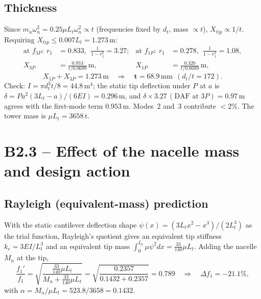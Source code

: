 \documentclass[11pt,a4paper]{article}
\begin{document}
\subsection*{Thickness}
Since $m_n\omega_n^2=0.25\mu L_t\omega_n^2\propto t$ (frequencies fixed by $d_t$, mass $\propto t$), $X_{tip}\propto1/t$. Requiring $X_{tip}\le0.007L_t=1.273\,\mathrm{m}$:
\begin{align*}
\text{at }f_{3P}:\ r_1&=0.833,\ \ \frac{1}{1-r_1^2}=3.27; &
\text{at }f_{1P}:\ r_1&=0.278,\ \ \frac{1}{1-r_1^2}=1.08,\\
X_{3P}&=\frac{0.953}{t/0.0689}\,\mathrm{m}, & X_{1P}&=\frac{0.320}{t/0.0689}\,\mathrm{m},
\end{align*}
\[
X_{1P}+X_{3P}=1.273\,\mathrm{m}\quad\Rightarrow\quad \mathbf{t=68.9\,\mathrm{mm}}\ \ (d_t/t=172).
\]
Check: $I=\pi d_t^3t/8=44.8\,\mathrm{m^4}$; the static tip deflection under $P$ at $a$ is $\delta=Pa^2(3L_t-a)/(6EI)=0.296\,\mathrm{m}$, and $\delta\times3.27\,(\text{DAF at }3P)=0.97\,\mathrm{m}$ agrees with the first-mode term $0.953\,\mathrm{m}$. Modes~2 and~3 contribute $<2\%$. The tower mass is $\mu L_t=3658\,\mathrm{t}$.

\section{B2.3 -- Effect of the nacelle mass and design action}\label{sec:b23}
\subsection*{Rayleigh (equivalent-mass) prediction}
With the static cantilever deflection shape $\psi(x)=(3L_tx^2-x^3)/(2L_t^3)$ as the trial function, Rayleigh's quotient gives an equivalent tip stiffness $k_e=3EI/L_t^3$ and an equivalent tip mass $\int_0^{L_t}\mu\psi^2dx=\tfrac{33}{140}\mu L_t$. Adding the nacelle $M_n$ at the tip,
\begin{equation}
\frac{f_1'}{f_1}=\sqrt{\frac{\tfrac{33}{140}\mu L_t}{M_n+\tfrac{33}{140}\mu L_t}}
=\sqrt{\frac{0.2357}{0.1432+0.2357}}=0.789\quad\Rightarrow\quad \Delta f_1=-21.1\%,
\label{eq:rayleigh}
\end{equation}
with $\alpha=M_n/\mu L_t=523.8/3658=0.1432$.
\end{document}
